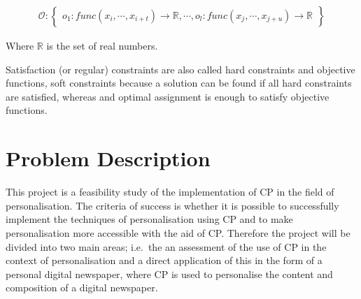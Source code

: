 \begin{align*}
	\mathcal{O} :
	\begin{Bmatrix}
		o_1 : func(x_i, \cdots,x_{i+t}) \rightarrow \mathbb{R}, \cdots, o_l : func(x_j, \cdots,x_{j+u}) \rightarrow \mathbb{R}
	\end{Bmatrix}
\end{align*}

Where $\mathbb{R}$ is the set of real numbers.

Satisfaction (or regular) constraints are also called hard constraints and objective functions, soft constraints because a solution can be found if all hard constraints are satisfied, whereas and optimal assignment is enough to satisfy objective functions.

\section{Problem Description}
This project is a feasibility study of the implementation of CP in the field of personalisation. The criteria of success is whether it is possible to successfully implement the techniques of personalisation using CP and to make personalisation more accessible with the aid of CP.
Therefore the project will be divided into two main areas; i.e.\ the an assessment of the use of CP in the context of personalisation and a direct application of this in the form of a personal digital newspaper, where CP is used to personalise the content and composition of a digital newspaper.

